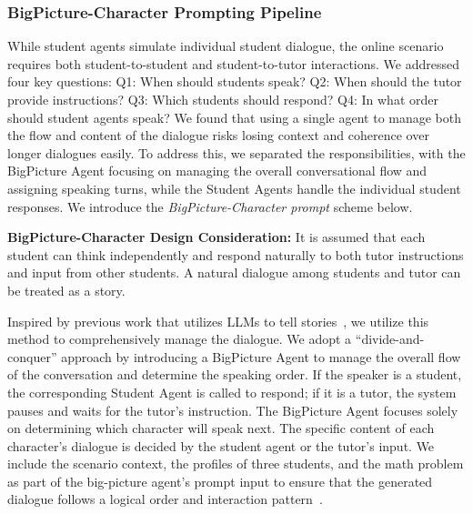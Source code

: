 \subsubsection{BigPicture-Character Prompting Pipeline}
While student agents simulate individual student dialogue, the online scenario requires both student-to-student and student-to-tutor interactions. We addressed four key questions: Q1: When should students speak? Q2: When should the tutor provide instructions? Q3: Which students should respond? Q4: In what order should student agents speak? We found that using a single agent to manage both the flow and content of the dialogue risks losing context and coherence over longer dialogues easily. To address this, we separated the responsibilities, with the BigPicture Agent focusing on managing the overall conversational flow and assigning speaking turns, while the Student Agents handle the individual student responses. We introduce the \textit{BigPicture-Character prompt} scheme below.


\textbf{BigPicture-Character Design Consideration:} It is assumed that each student can think independently and respond naturally to both tutor instructions and input from other students. A natural dialogue among students and tutor can be treated as a story. 
 
Inspired by previous work that utilizes LLMs to tell stories~\cite{mirowski2023co,shakeri2021saga,grigis2024playwriting}, we utilize this method to comprehensively manage the dialogue. We adopt a ``divide-and-conquer'' approach by introducing a BigPicture Agent to manage the overall flow of the conversation and determine the speaking order. If the speaker is a student, the corresponding Student Agent is called to respond; if it is a tutor, the system pauses and waits for the tutor's instruction. The BigPicture Agent focuses solely on determining which character will speak next. The specific content of each character's dialogue is decided by the student agent or the tutor's input. We include the scenario context, the profiles of three students, and the math problem as part of the big-picture agent's prompt input to ensure that the generated dialogue follows a logical order and interaction pattern~\cite{stamper2024enhancing}. 

